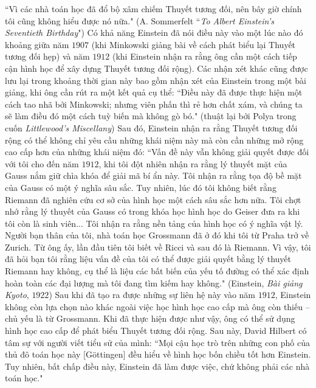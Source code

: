 \begin{multicols}{2}
	\vskip 0.1cm
	``Vì các nhà toán học đã đổ bộ xâm chiếm Thuyết tương đối, nên bây giờ chính tôi cũng không hiểu được nó nữa."
	\vskip 0.1cm
	\hfill (A. Sommerfelt 
	\vskip 0.01cm
	\hfill``\textit{To Albert Einstein's Seventieth Birthday}")
	\vskip 0.1cm
	Có khả năng Einstein đã nói điều này vào một lúc nào đó khoảng giữa năm $1907$ (khi Minkowski giảng bài về cách phát biểu lại Thuyết tương đối hẹp) và năm $1912$ (khi Einstein nhận ra rằng ông cần một cách tiếp cận hình học để xây dựng Thuyết tương đối rộng).
	\vskip 0.1cm
	Các nhận xét khác cũng được lưu lại trong khoảng thời gian này bao gồm nhận xét của Einstein trong một bài giảng, khi ông cần rút ra một kết quả cụ thể:
	\vskip 0.1cm
	``Điều này đã được thực hiện một cách tao nhã bởi Minkowski; nhưng viên phấn thì rẻ hơn chất xám, và chúng ta sẽ làm điều đó một cách tuỳ biến mà không gò bó."
	\vskip 0.1cm
	\hfill(thuật lại bởi Polya trong cuốn
	\vskip 0.01cm
	\hfill \textit{Littlewood's Miscellany})
	\vskip 0.1cm
	Sau đó, Einstein nhận ra rằng Thuyết tương đối rộng có thể không chỉ yêu cầu những khái niệm này mà còn cần những mở rộng cao cấp hơn của những khái niệm đó:
	\vskip 0.1cm
	``Vấn đề này vẫn không giải quyết được đối với tôi cho đến năm $1912$, khi tôi đột nhiên nhận ra rằng lý thuyết mặt của Gauss nắm giữ chìa khóa để giải mã bí ẩn này. Tôi nhận ra rằng tọa độ bề mặt của Gauss có một ý nghĩa sâu sắc. Tuy nhiên, lúc đó tôi không biết rằng Riemann đã nghiên cứu cơ sở của hình học một cách sâu sắc hơn nữa. Tôi chợt nhớ rằng lý thuyết của Gauss có trong khóa học hình học do Geiser đưa ra khi tôi còn là sinh viên...
	\vskip 0.1cm
	Tôi nhận ra rằng nền tảng của hình học có ý nghĩa vật lý. Người bạn thân của tôi, nhà toán học Grossmann đã ở đó khi tôi từ Praha trở về Zurich. Từ ông ấy, lần đầu tiên tôi biết về Ricci và sau đó là Riemann. Vì vậy, tôi đã hỏi bạn tôi rằng liệu vấn đề của tôi có thể được giải quyết bằng lý thuyết Riemann hay không, cụ thể là liệu các bất biến của yếu tố đường có thể xác định hoàn toàn các đại lượng mà tôi đang tìm kiếm hay không."
	\vskip 0.1cm
	\hfill (Einstein, \textit{Bài giảng Kyoto}, $1922$)
	\vskip 0.1cm
	Sau khi đã tạo ra được những sự liên hệ này vào năm $1912$, Einstein không còn lựa chọn nào khác ngoài việc học hình học cao cấp mà ông còn thiếu -- chủ yếu là từ Grossmann. Khi  đã  thực hiện được như vậy, ông có thể sử dụng hình học cao cấp để phát biểu Thuyết tương đối rộng.
	\vskip 0.1cm
	Sau này, David Hilbert có tâm sự với người viết tiểu sử của mình:
	\vskip 0.1cm
	``Mọi cậu học trò trên những con phố của thủ đô toán học này [Göttingen] đều hiểu về hình học bốn chiều tốt hơn Einstein. Tuy nhiên, bất chấp điều này, Einstein đã làm được việc, chứ không phải các nhà toán học."

\end{multicols}
